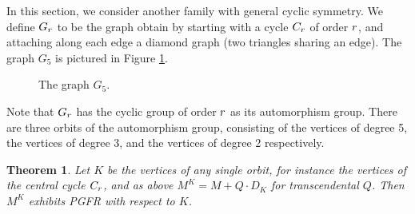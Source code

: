 \documentclass[11pt]{article}
\newtheorem{theorem}[theo]{Theorem}
\theoremstyle{definition}
\numberwithin{equation}{section}
\newcommand\+{\mkern2mu}
\newcommand{\1}{\mathbf 1}
\begin{document}
In this section, we consider another family with general cyclic symmetry.  We define $G_{r}$ to be the graph obtain by starting with a cycle $C_{r}$ of order $r$, and attaching along each edge a diamond graph (two triangles sharing an edge).  The graph $G_5$ is pictured in Figure \ref{fig:cycle_diamond}.
\begin{figure}
\begin{center}
\end{center}
\caption{The graph $G_5$.}\label{fig:cycle_diamond}
\end{figure}
Note that $G_r$ has the cyclic group of order $r$ as its automorphism group.  There are three orbits of the automorphism group, consisting of the vertices of degree 5, the vertices of degree 3, and the vertices of degree 2 respectively.  

\begin{theorem}
Let $K$ be the vertices of any single orbit, for instance the vertices of the central cycle $C_r$, and as above $M^K=M+Q\cdot D_K$ for transcendental $Q$.  Then $M^K$ exhibits PGFR with respect to $K$.
\end{theorem}
\end{document}
